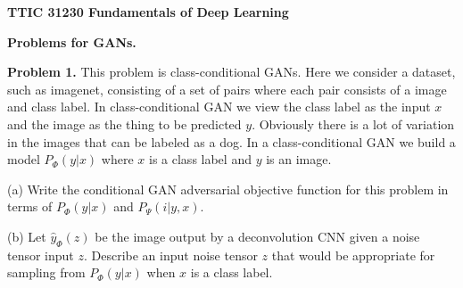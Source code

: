 \documentclass{article}
\begin{document}
\centerline{\bf TTIC 31230 Fundamentals of Deep Learning}

\bigskip

\centerline{\bf Problems for GANs.}

\bigskip
\bigskip
{\bf Problem 1.} This problem is class-conditional GANs.  Here we consider a dataset, such as imagenet, consisting of a set of pairs where each pair
consists of a image and class label.  In class-conditional GAN we view the class label as the input $x$ and the image as the thing to be predicted $y$.
Obviously there is a lot of variation in the images that can be labeled as a dog.  In a class-conditional GAN we build a model $P_\Phi(y|x)$ where $x$ is a class
label and $y$ is an image.

\medskip
(a) Write the conditional GAN adversarial objective function for this problem in terms of $P_\Phi(y|x)$ and $P_\Psi(i|y,x)$.

\medskip
(b) Let $\hat{y}_\Phi(z)$ be the image output by a deconvolution CNN given a noise tensor input $z$.  Describe an input noise tensor $z$ that would be appropriate for
sampling from $P_\Phi(y|x)$ when $x$ is a class label.
\end{document}
